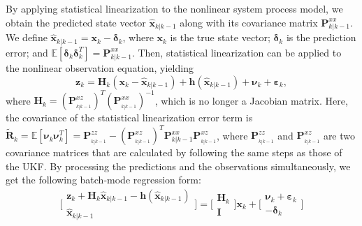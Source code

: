 \documentclass[10pt]{IEEEtran}
\begin{document}
By applying statistical linearization to the nonlinear system process model, we obtain the predicted state vector ${\bm{\widehat x}_{k\left| {k - 1} \right.}}$ along with its covariance matrix $\bm{P}_{k\left| {k - 1} \right.}^{xx}$. We define ${\bm{\widehat x}_{k\left| {k - 1} \right.}} = {\bm{x}_k} - {\bm{\delta} _k}$, where $\bm{x}_k$ is the true state vector; $\bm{\delta}_k$ is the prediction error; and $\mathbb{E}\left[ {{\bm{\delta } _k}\bm{\delta} _k^T} \right] = {\bm{P} _{k\left| {k - 1} \right.}^{xx}}$. Then, statistical linearization can be applied to the nonlinear observation equation, yielding
\vspace{-0.2cm}
\begin{equation}
{\bm{z}_k} = {\bm{H}_k}\left( {{\bm{x}_k} - {{\bm{\widehat x}}_{k\left| {k - 1} \right.}}} \right) + \bm{h}\left( {{{\bm{\widehat x}}_{k\left| {k - 1} \right.}}} \right) + {\bm{\nu}_k} + {\bm{\varepsilon}_k},
\label{Eq:statistical_linearization_observation_function}
\end{equation}
where ${\bm{H}_k} = {( {\bm{P}_{_{k\left| {k - 1} \right.}}^{xz}} )^T}(\bm{P}_{_{k\left| {k - 1} \right.}}^{xx})^{-1}$, which is no longer a Jacobian matrix. Here, the covariance of the statistical linearization error term is $\bm{\widetilde{R}}_k=\mathbb{E}\left[ {{\bm{\nu}_k}{\bm{\nu}_k^T}} \right] = \bm{P}_{_{k\left| {k - 1} \right.}}^{zz} - {( {\bm{P}_{_{k\left| {k - 1} \right.}}^{xz}} )^T}{\bm{P}_{k\left| {k - 1} \right.}^{xx}}\bm{P}_{_{k\left| {k - 1} \right.}}^{xz}$, where $\bm{P}_{_{k\left| {k - 1} \right.}}^{zz}$ and ${\bm{P}_{_{k\left| {k - 1} \right.}}^{xz}}$ are two covariance matrices that are calculated by following the same steps as those of the UKF. By processing the predictions and the observations simultaneously, we get the following batch-mode regression form:
\begin{equation}
\bigg[ {\begin{array}{*{10}{c}}
{{\bm{z}_k} + {\bm{H}_k}{{\bm{\widehat x}}_{k| {k - 1}}} - \bm{h}( {{{\bm{\widehat x}}_{k| {k - 1}}}})}\\
{{{\bm{\widehat x}}_{k|{k - 1}}}}
\end{array}}\bigg] = \bigg[ {\begin{array}{*{10}{c}}
{{\bm{H}_k}}\\
\bm{I}
\end{array}}\bigg]{\bm{x}_k} + \bigg[ {\begin{array}{*{10}{c}}
{{\bm{\nu}_k} + {\bm{\varepsilon}_k}}\\
{ - {\bm{\delta}_k}}
\end{array}}\bigg]
\label{Eq:batchmodel}
\end{equation}
\end{document}
